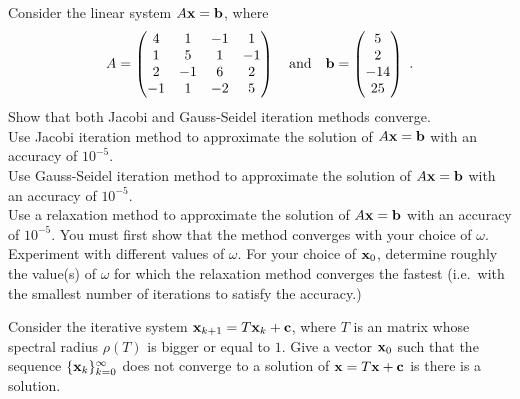\begin{question}
Consider the linear system $A\mathbf{x} = \mathbf{b}$, where
\[
A = \begin{pmatrix} 4 & 1 & -1 & 1 \\ 1 & 5 & 1 & -1 \\
2 & -1 & 6 & 2 \\ -1 & 1 & -2 & 5
\end{pmatrix}
\quad \text{and} \quad
\mathbf{b} = \begin{pmatrix} 5 \\ 2 \\ -14 \\ 25 \end{pmatrix} \ .
\]
 Show that both Jacobi and Gauss-Seidel iteration methods
converge.\\
 Use Jacobi iteration method to approximate the solution of
$A\mathbf{x} = \mathbf{b}$ with an accuracy of $10^{-5}$.\\
 Use Gauss-Seidel iteration method to approximate the solution of
$A\mathbf{x} = \mathbf{b}$ with an accuracy of $10^{-5}$.\\
 Use a relaxation method to approximate the solution of
$A\mathbf{x} = \mathbf{b}$ with an accuracy of $10^{-5}$.  You must first
show that the method converges with your choice of $\omega$.
Experiment with different values of $\omega$.  For your choice of
$\mathbf{x}_0$, determine roughly the value(s) of $\omega$ for which the
relaxation method converges the fastest (i.e.\ with the smallest number
of iterations to satisfy the accuracy.)
\label{solvBQ10}
\end{question}

\begin{question}
Consider the iterative system $\mathbf{x}_{k+1} = T \mathbf{x}_k + \mathbf{c}$,
where $T$ is an \nn matrix whose spectral radius $\rho(T)$ is bigger
or equal to $1$.  Give a vector $\mathbf{x}_0$ such that the sequence
$\{ \mathbf{x}_k \}_{k=0}^\infty$ does not converge to a solution of
$\mathbf{x} = T \mathbf{x} + \mathbf{c}$ is there is a solution.
\label{solvBQ11}
\end{question}

